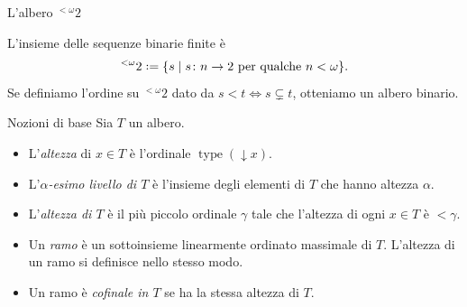 \documentclass{beamer}
\theoremstyle{num.custom-title}
\theoremstyle{custom-title}
\DeclareMathOperator{\type}{type}
\DeclareMathOperator{\height}{height}
\DeclareMathOperator{\down}{\downarrow}
\newcommand*{\defeq}{\mathrel{\rlap{%
                     \raisebox{0.3ex}{$\cdot$}}%
                     \raisebox{-0.3ex}{$\cdot$}}%
                     =}
\renewcommand{\iff}{\Leftrightarrow}
\begin{document}
\begin{frame}{L'albero ${}^{< \omega} 2$}

L'insieme delle sequenze binarie finite è 
\[
{}^{< \omega} 2 \defeq \{s \mid s \colon n \to 2 \text{ per qualche } n < \omega\}.
\]
Se definiamo l'ordine su ${}^{< \omega} 2$ dato da $s < t \iff s \subsetneq t$, otteniamo un albero binario.


\end{frame}



\begin{frame}{Nozioni di base}
Sia $T$ un albero.
\begin{itemize}
\item L'\emph{altezza} di $x \in T$ è l'ordinale $\type(\down x)$.
\item L'\emph{$\alpha$-esimo livello di $T$} è l'insieme degli elementi di $T$ che hanno altezza $\alpha$.
\item L'\emph{altezza di $T$} è il più piccolo ordinale $\gamma$ tale che l'altezza di ogni $x \in T$ è $< \gamma$.
\item Un \emph{ramo} è un sottoinsieme linearmente ordinato massimale di $T$. L'altezza di un ramo si definisce nello stesso modo.
\item Un ramo è \emph{cofinale in $T$} se ha la stessa altezza di $T$.
\end{itemize}
\end{frame}
\end{document}
